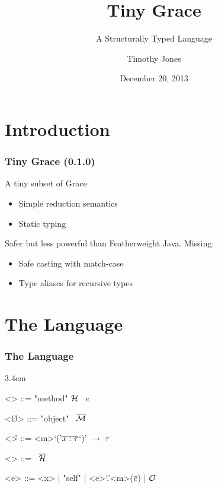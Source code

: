 \documentclass[xcolor=pdftex,x11names]{beamer}
\title{\huge Tiny Grace}
\subtitle{\Large A Structurally Typed Language}
\author{Timothy Jones}
\date{December 20, 2013}
\begin{document}
\maketitle


\section{Introduction}

\begin{frame}
  \frametitle{Tiny Grace (0.1.0)}

  A tiny subset of Grace

  \begin{itemize}\itemsep1em
    \item Simple reduction semantics

    \item Static typing
  \end{itemize}

  Safer but less powerful than Featherweight Java.  Missing:

  \begin{itemize}\itemsep1em
    \item Safe casting with match-case

    \item Type aliases for recursive types
  \end{itemize}
\end{frame}


\section{The Language}

\begin{frame}[fragile]
  \frametitle{The Language}

  \grammarindent3.4em
  \renewcommand{\grammarlabel}[2]{$#1$\hfill#2}
  \renewcommand{\syntleft}{\itshape}
  \renewcommand{\syntright}{}
  \renewcommand{\ulitleft}{\sffamily\bfseries}
  \renewcommand{\litleft}{\sffamily}
  \renewcommand{\litright}{}

  \begin{grammar}
    <\M> ::= "method" $\mathcal{H}$ \bo~$e$ \bc

    <\O> ::= "object" \bo~$\*\M*$ \bc

    <\H> ::= <m>`('$\*x : \tau*$`)' $\to$ $\tau$

    <\tau> ::= \bo~$\*\H*$ \bc

    <e> ::= <x> | "self" | <e>`.'<m>($\*e*$) | $\mathcal{O}$
  \end{grammar}
\end{frame}
\end{document}
